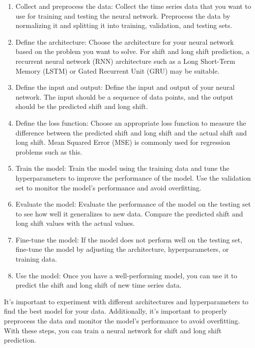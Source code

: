         \begin{enumerate}
            \item Collect and preprocess the data: Collect the time series data that you want to use for training and testing the neural network. Preprocess the data by normalizing it and splitting it into training, validation, and testing sets.
            \item Define the architecture: Choose the architecture for your neural network based on the problem you want to solve. For shift and long shift prediction, a recurrent neural network (RNN) architecture such as a Long Short-Term Memory (LSTM) or Gated Recurrent Unit (GRU) may be suitable.
            \item Define the input and output: Define the input and output of your neural network. The input should be a sequence of data points, and the output should be the predicted shift and long shift.
            \item Define the loss function: Choose an appropriate loss function to measure the difference between the predicted shift and long shift and the actual shift and long shift. Mean Squared Error (MSE) is commonly used for regression problems such as this.
            \item Train the model: Train the model using the training data and tune the hyperparameters to improve the performance of the model. Use the validation set to monitor the model's performance and avoid overfitting.
            \item Evaluate the model: Evaluate the performance of the model on the testing set to see how well it generalizes to new data. Compare the predicted shift and long shift values with the actual values.
            \item Fine-tune the model: If the model does not perform well on the testing set, fine-tune the model by adjusting the architecture, hyperparameters, or training data.
            \item Use the model: Once you have a well-performing model, you can use it to predict the shift and long shift of new time series data.
        \end{enumerate}
        It's important to experiment with different architectures and hyperparameters to find the best model for your data.
        Additionally, it's important to properly preprocess the data and monitor the model's performance to avoid overfitting.
        With these steps, you can train a neural network for shift and long shift prediction.\\
